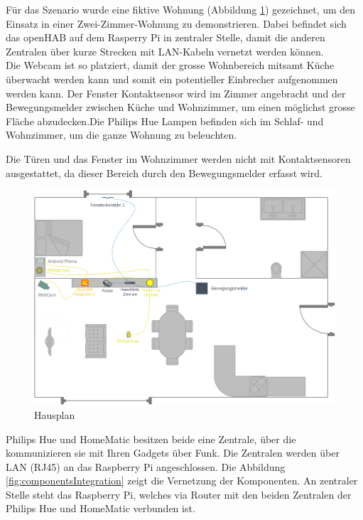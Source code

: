 Für das Szenario wurde eine fiktive Wohnung (Abbildung \ref{fig:housePlan}) gezeichnet, um den Einsatz in einer Zwei-Zimmer-Wohnung zu demonstrieren. Dabei befindet sich das openHAB auf dem Rasperry Pi in zentraler Stelle, damit die anderen Zentralen über kurze Strecken mit LAN-Kabeln vernetzt werden können.\\
Die Webcam ist so platziert, damit der grosse Wohnbereich mitsamt Küche überwacht werden kann und somit ein potentieller Einbrecher aufgenommen werden kann. Der Fenster Kontaktsensor wird im Zimmer angebracht und der Bewegungsmelder zwischen Küche und Wohnzimmer, um einen möglichst grosse Fläche abzudecken.Die Philips Hue Lampen befinden sich im Schlaf- und Wohnzimmer, um die ganze Wohnung zu beleuchten.

Die Türen und das Fenster im Wohnzimmer werden nicht mit Kontaktsensoren ausgestattet, da dieser Bereich durch den Bewegungsmelder erfasst wird.

\begin{figure}[H]
	\centering
		\includegraphics[scale=0.55]{report/img/hausplan_aktuell}
	\caption{Hausplan}
	\label{fig:housePlan}
\end{figure}

Philips Hue und HomeMatic besitzen beide eine Zentrale, über die kommunizieren sie mit Ihren Gadgets über Funk. Die Zentralen werden über LAN (RJ45) an das Raspberry Pi angeschlossen. Die Abbildung \ref{fig:componentsIntegration} zeigt die Vernetzung der Komponenten. An zentraler Stelle steht das Raspberry Pi, welches via Router mit den beiden Zentralen der Philips Hue und HomeMatic verbunden ist.

